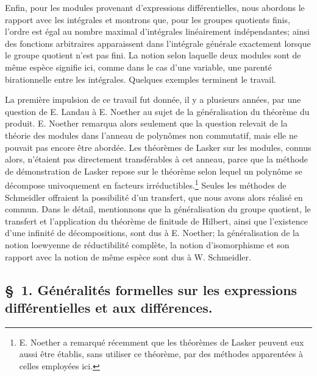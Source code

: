 Enfin, pour les modules provenant d'expressions différentielles, nous abordons le rapport avec les intégrales et montrons que, pour les groupes quotients finis, l'ordre est égal au nombre maximal d'intégrales linéairement indépendantes; ainsi des fonctions arbitraires apparaissent dans l'intégrale générale exactement lorsque le groupe quotient n'est pas fini. La notion selon laquelle deux modules sont de même espèce signifie ici, comme dans le cas d'une variable, une parenté \og{} birationnelle \fg{} entre les intégrales. Quelques exemples terminent le travail.

La première impulsion de ce travail fut donnée, il y a plusieurs années, par une question de E. Landau à E. Noether au sujet de la généralisation du théorème du produit. E. Noether remarqua alors seulement que la question relevait de la théorie des modules dans l'anneau de polynômes non commutatif, mais elle ne pouvait pas encore être abordée. Les théorèmes de Lasker sur les modules, connus alors, n'étaient pas directement transférables à cet anneau, parce que la méthode de démonstration de Lasker repose sur le théorème selon lequel un polynôme se décompose univoquement en facteurs irréductibles.\footnote{E. Noether a remarqué récemment que les théorèmes de Lasker peuvent eux aussi être établis, sans utiliser ce théorème, par des méthodes apparentées à celles employées ici.} Seules les méthodes de Schmeidler offraient la possibilité d'un transfert, que nous avons alors réalisé en commun. Dans le détail, mentionnons que la généralisation du groupe quotient, le transfert et l'application du théorème de finitude de Hilbert, ainsi que l'existence d'une infinité de décompositions, sont dus à E. Noether; la généralisation de la notion loewyenne de réductibilité complète, la notion d'isomorphisme et son rapport avec la notion de même espèce sont dus à W. Schmeidler.

\subsection*{\S~1. Généralités formelles sur les expressions différentielles et aux différences.}

